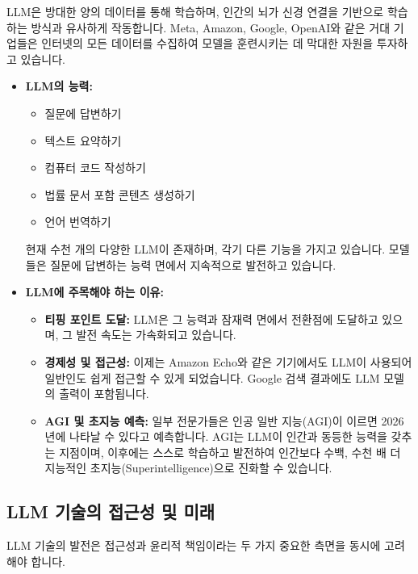 \documentclass[11pt,a4paper]{article}
\theoremstyle{definition}
\begin{document}
LLM은 방대한 양의 데이터를 통해 학습하며, 인간의 뇌가 신경 연결을 기반으로 학습하는 방식과 유사하게 작동합니다. Meta, Amazon, Google, OpenAI와 같은 거대 기업들은 인터넷의 모든 데이터를 수집하여 모델을 훈련시키는 데 막대한 자원을 투자하고 있습니다.

\begin{itemize}
    \item \textbf{LLM의 능력:}
    \begin{itemize}
        \item 질문에 답변하기
        \item 텍스트 요약하기
        \item 컴퓨터 코드 작성하기
        \item 법률 문서 포함 콘텐츠 생성하기
        \item 언어 번역하기
    \end{itemize}
    현재 수천 개의 다양한 LLM이 존재하며, 각기 다른 기능을 가지고 있습니다. 모델들은 질문에 답변하는 능력 면에서 지속적으로 발전하고 있습니다.

    \item \textbf{LLM에 주목해야 하는 이유:}
    \begin{itemize}
        \item \textbf{티핑 포인트 도달:} LLM은 그 능력과 잠재력 면에서 전환점에 도달하고 있으며, 그 발전 속도는 가속화되고 있습니다.
        \item \textbf{경제성 및 접근성:} 이제는 Amazon Echo와 같은 기기에서도 LLM이 사용되어 일반인도 쉽게 접근할 수 있게 되었습니다. Google 검색 결과에도 LLM 모델의 출력이 포함됩니다.
        \item \textbf{AGI 및 초지능 예측:} 일부 전문가들은 인공 일반 지능(AGI)이 이르면 2026년에 나타날 수 있다고 예측합니다. AGI는 LLM이 인간과 동등한 능력을 갖추는 지점이며, 이후에는 스스로 학습하고 발전하여 인간보다 수백, 수천 배 더 지능적인 초지능(Superintelligence)으로 진화할 수 있습니다.
    \end{itemize}
\end{itemize}

\subsection{LLM 기술의 접근성 및 미래}

LLM 기술의 발전은 접근성과 윤리적 책임이라는 두 가지 중요한 측면을 동시에 고려해야 합니다.
\end{document}
